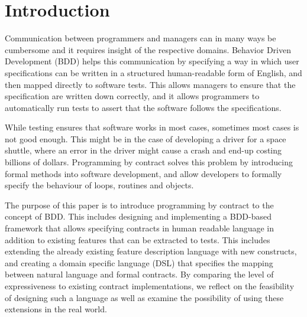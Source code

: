 \section{Introduction} %

Communication between programmers and managers can in many ways be cumbersome and it requires insight of the respective domains. Behavior Driven Development (BDD) \cite{hellesoy2012} helps this communication by specifying a way in which user specifications can be written in a structured human-readable form of English, and then mapped directly to software tests. This allows managers to ensure that the specification are written down correctly, and it allows programmers to automatically run tests to assert that the software follows the specifications. 

While testing ensures that software works in most cases, sometimes most cases is not good enough. This might be in the case of developing a driver for a space shuttle, where an error in the driver might cause a crash and end-up costing billions of dollars.  Programming by contract solves this problem by introducing formal methods into software development, and allow developers to formally specify the behaviour of loops, routines and objects. 

The purpose of this paper is to introduce programming by contract to the concept of BDD. This includes designing and implementing a BDD-based framework that allows specifying contracts in human readable language in addition to existing features that can be extracted to tests. This includes extending the already existing feature description language \cite{hellesoy2012} with new constructs, and creating a domain specific language (DSL) that specifies the mapping between natural language and formal contracts. By comparing the level of expressiveness to existing contract implementations, we reflect on the feasibility of designing such a language as well as examine the possibility of using these extensions in the real world. 


